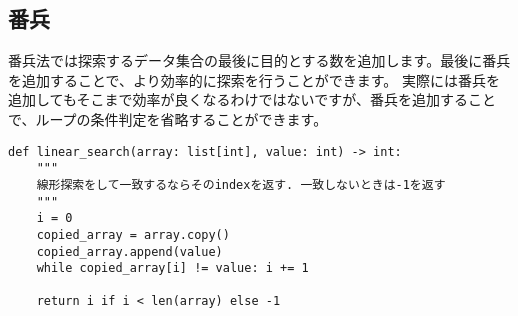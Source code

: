 \documentclass{jlreq}
\begin{document}
\subsection{番兵}

番兵法では探索するデータ集合の最後に目的とする数を追加します。最後に番兵を追加することで、より効率的に探索を行うことができます。
実際には番兵を追加してもそこまで効率が良くなるわけではないですが、番兵を追加することで、ループの条件判定を省略することができます。

\vspace{0.5cm}

\begin{center}
\end{center}

\begin{lstlisting}[caption=番兵の実装, frame=TRBL, label={sentinel}]
def linear_search(array: list[int], value: int) -> int:
    """
    線形探索をして一致するならそのindexを返す. 一致しないときは-1を返す
    """
    i = 0
    copied_array = array.copy()
    copied_array.append(value)
    while copied_array[i] != value: i += 1
    
    return i if i < len(array) else -1
  \end{lstlisting}
\end{document}
